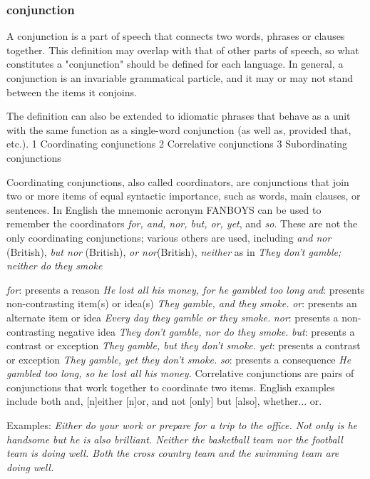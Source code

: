 \begin{small}
\subsubsection{conjunction}
A conjunction  is a part of speech that connects two words, phrases or clauses together. This definition may overlap with that of other parts of speech, so what constitutes a "conjunction" should be defined for each language. In general, a conjunction is an invariable grammatical particle, and it may or may not stand between the items it conjoins.

The definition can also be extended to idiomatic phrases that behave as a unit with the same function as a single-word conjunction (as well as, provided that, etc.).
1 Coordinating conjunctions
2 Correlative conjunctions
3 Subordinating conjunctions

Coordinating conjunctions, also called coordinators, are conjunctions that join two or more items of equal syntactic importance, such as words, main clauses, or sentences. In English the mnemonic acronym FANBOYS can be used to remember the coordinators \emph{for, and, nor, but, or, yet}, and \emph{so}. These are not the only coordinating conjunctions; various others are used, including \emph{and nor} (British), \emph{but nor} (British), \emph{or nor}(British), \emph{neither} as in \emph{They don't gamble; neither do they smoke}

\emph{for}: presents a reason \emph{He lost all his money, for he gambled too long}
\emph{and}: presents non-contrasting item(s) or idea(s)\emph{ They gamble, and they smoke.}
\emph{or}: presents an alternate item or idea \emph{Every day they gamble or they smoke.}
\emph{nor}: presents a non-contrasting negative idea \emph{They don't gamble, nor do they smoke.}
\emph{but}: presents a contrast or exception \emph{They gamble, but they don't smoke.}
\emph{yet}: presents a contrast or exception \emph{They gamble, yet they don't smoke.}
\emph{so}: presents a consequence \emph{He gambled too long, so he lost all his money.}
Correlative conjunctions are pairs of conjunctions that work together to coordinate two items. English examples include both and, [n]either [n]or, and not [only] but [also], whether... or.

Examples:
\emph{
Either do your work or prepare for a trip to the office.
Not only is he handsome but he is also brilliant.
Neither the basketball team nor the football team is doing well.
Both the cross country team and the swimming team are doing well.
}

\end{small}
